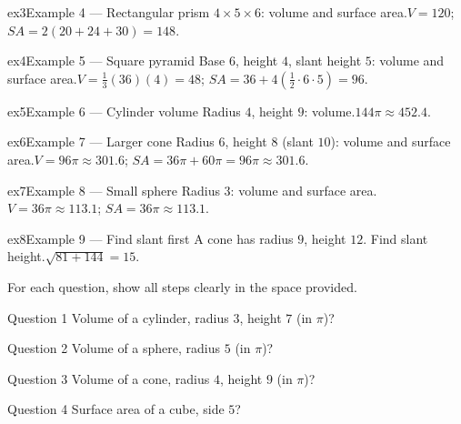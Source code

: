 \documentclass[11pt]{article}
\begin{document}
\begin{example}{ex3}{Example 4 --- Rectangular prism}
$4\times5\times6$: volume and surface area.\soln $V=120$; $SA=2(20+24+30)=148$.
\end{example}

\begin{example}{ex4}{Example 5 --- Square pyramid}
Base $6$, height $4$, slant height $5$: volume and surface area.\soln $V=\tfrac13(36)(4)=48$; $SA=36+4(\tfrac12\cdot6\cdot5)=96$.
\end{example}

\begin{example}{ex5}{Example 6 --- Cylinder volume}
Radius $4$, height $9$: volume.\soln $144\pi\approx452.4$.
\end{example}

\begin{example}{ex6}{Example 7 --- Larger cone}
Radius $6$, height $8$ (slant $10$): volume and surface area.\soln $V=96\pi\approx301.6$; $SA=36\pi+60\pi=96\pi\approx301.6$.
\end{example}

\begin{example}{ex7}{Example 8 --- Small sphere}
Radius $3$: volume and surface area.\soln $V=36\pi\approx113.1$; $SA=36\pi\approx113.1$.
\end{example}

\begin{example}{ex8}{Example 9 --- Find slant first}
A cone has radius $9$, height $12$. Find slant height.\soln $\sqrt{81+144}=15$.
\end{example}

\clearpage
{}
For each question, show all steps clearly in the space provided.

\begin{qbox}{Question 1}
Volume of a cylinder, radius $3$, height $7$ (in $\pi$)?\workspace{2.4cm}
\end{qbox}

\begin{qbox}{Question 2}
Volume of a sphere, radius $5$ (in $\pi$)?\workspace{2.4cm}
\end{qbox}

\begin{qbox}{Question 3}
Volume of a cone, radius $4$, height $9$ (in $\pi$)?\workspace{2.4cm}
\end{qbox}

\begin{qbox}{Question 4}
Surface area of a cube, side $5$?\workspace{2.4cm}
\end{qbox}
\end{document}
